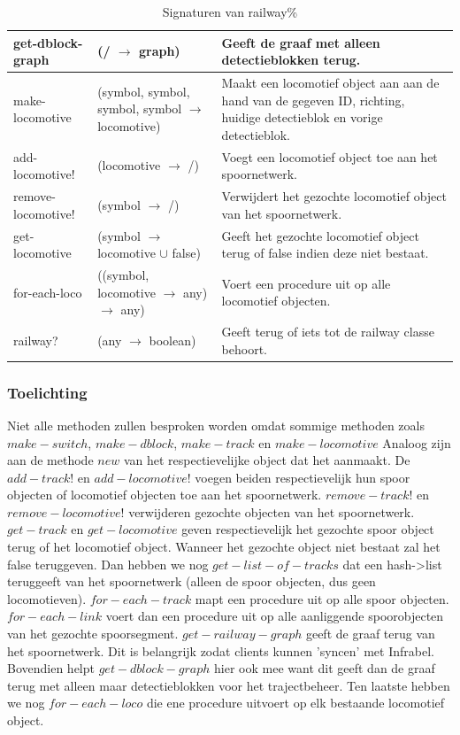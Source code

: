 \documentclass{article}
\begin{document}
\begin{table}[h!]
\begin{tabular}{|p{2.9cm}|p{4cm}|p{6.1cm}|}
                \hline
                get-dblock-graph & (/ $\rightarrow$ graph) & Geeft de graaf met alleen detectieblokken terug. \\
                \hline
                make-locomotive & (symbol, symbol, symbol, symbol $\rightarrow$ locomotive) & Maakt een locomotief object aan aan de hand van de gegeven
                ID, richting, huidige detectieblok en vorige detectieblok. \\
                \hline
                add-locomotive! & (locomotive $\rightarrow$ /) & Voegt een locomotief object toe aan het spoornetwerk.\\
                \hline
                remove-locomotive! & (symbol $\rightarrow$ /) & Verwijdert het gezochte locomotief object van het spoornetwerk. \\
                \hline
                get-locomotive & (symbol $\rightarrow$ locomotive $\cup$ false) & Geeft het gezochte locomotief object terug of false indien deze niet bestaat. \\
                \hline
                for-each-loco & ((symbol, locomotive $\rightarrow$ any) $\rightarrow$ any) & Voert een procedure uit op alle locomotief objecten. \\
                \hline
                railway? & (any $\rightarrow$ boolean) & Geeft terug of iets tot de railway classe behoort. \\
                \hline
        \end{tabular}
        \caption{Signaturen van railway\%}
\end{table}
\subsubsection{Toelichting}
Niet alle methoden zullen besproken worden omdat sommige methoden zoals $make-switch$, $make-dblock$, $make-track$ en $make-locomotive$
Analoog zijn aan de methode $new$ van het respectievelijke object dat het aanmaakt. De $add-track!$ en $add-locomotive!$ voegen beiden respectievelijk hun spoor objecten of locomotief objecten
toe aan het spoornetwerk. $remove-track!$ en $remove-locomotive!$ verwijderen gezochte objecten van het spoornetwerk. $get-track$ en $get-locomotive$ geven respectievelijk het gezochte spoor object terug of het locomotief object. Wanneer het gezochte object niet bestaat zal het false teruggeven.
Dan hebben we nog $get-list-of-tracks$ dat een hash->list teruggeeft van het spoornetwerk (alleen de spoor objecten, dus geen locomotieven). $for-each-track$ mapt een procedure uit op alle spoor objecten. $for-each-link$ voert dan een procedure uit op alle aanliggende 
spoorobjecten van het gezochte spoorsegment. $get-railway-graph$ geeft de graaf terug van het spoornetwerk. Dit is belangrijk zodat clients kunnen 'syncen' met Infrabel. Bovendien helpt $get-dblock-graph$ hier ook mee want 
dit geeft dan de graaf terug met alleen maar detectieblokken voor het trajectbeheer. Ten laatste hebben we nog $for-each-loco$ die ene procedure uitvoert op elk bestaande locomotief object.
\end{document}
